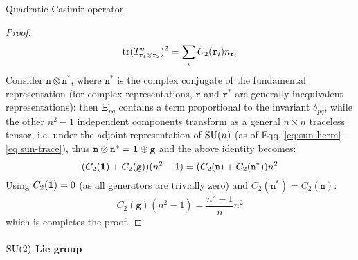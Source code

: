 \begin{proposition}{Quadratic Casimir operator}{}
\begin{proof}
\begin{equation*}
      \operatorname{tr} (T^a_{\mathtt{r}_1 \otimes \mathtt{r}_2})^2 = \sum_i C_2(\mathtt{r}_i) n_{\mathtt{r}_i}
    \end{equation*}
    Consider $ \mathtt{n} \otimes \mathtt{n}^* $, where $ \mathtt{n}^* $ is the complex conjugate of the fundamental representation (for complex representations, $ \mathtt{r} $ and $ \mathtt{r}^* $ are generally inequivalent representations): then $ \Xi_{pq} $ contains a term proportional to the invariant $ \delta_{pq} $, while the other $ n^2 - 1 $  independent components transform as a general $ n \times n $ traceless tensor, i.e. under the adjoint representation of $ \mathrm{SU}(n) $ (as of Eqq. \ref{eq:sun-herm}-\ref{eq:sun-trace}), thus $ \mathtt{n} \otimes \mathtt{n}^* = \mathbf{1} \oplus \mathtt{g} $ and the above identity becomes:
    \begin{equation*}
      (C_2(\mathbf{1}) + C_2(\mathtt{g})) (n^2 - 1) = (C_2(\mathtt{n}) + C_2(\mathtt{n}^*)) n^2
    \end{equation*}
    Using $ C_2(\mathbf{1}) = 0 $ (as all generators are trivially zero) and $ C_2(\mathtt{n}^*) = C_2(\mathtt{n}) $:
    \begin{equation*}
      C_2(\mathtt{g}) (n^2 - 1) = \frac{n^2 - 1}{n} n^2
    \end{equation*}
    which is completes the proof.
  \end{proof}
\end{proposition}

\paragraph{$ \mathrm{SU}(2) $ Lie group}

